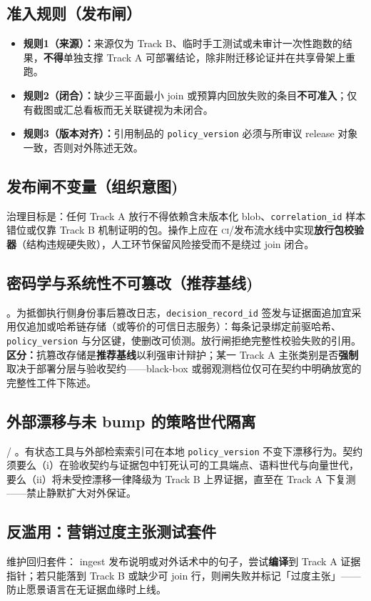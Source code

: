 \documentclass[11pt,a4paper]{report}
\begin{document}
\subsection{准入规则（发布闸）}
\begin{itemize}
  \item \textbf{规则1（来源）：}来源仅为 Track B、临时手工测试或未审计一次性跑数的结果，\textbf{不得}单独支撑 Track A 可部署结论，除非附迁移论证并在共享骨架上重跑。
  \item \textbf{规则2（闭合）：}缺少三平面最小 join 或预算内回放失败的条目\textbf{不可准入}；仅有截图或汇总看板而无关联键视为未闭合。
  \item \textbf{规则3（版本对齐）：}引用制品的 \texttt{policy\_version} 必须与所审议 release 对象一致，否则对外陈述无效。
\end{itemize}

\subsection{发布闸不变量（组织意图)}
治理目标是：任何 Track A 放行不得依赖含未版本化 blob、\texttt{correlation\_id} 样本错位或仅靠 Track B 机制证明的包。操作上应在 \textsc{ci}/发布流水线中实现\textbf{放行包校验器}（结构违规硬失败），人工环节保留风险接受而不是绕过 join 闭合。

\subsection{密码学与系统性不可篡改（推荐基线)}
\EvalFramework{}。为抵御执行侧身份事后篡改日志，\texttt{decision\_record\_id} 签发与证据面追加宜采用仅追加或哈希链存储（或等价的可信日志服务）：每条记录绑定前驱哈希、\texttt{policy\_version} 与分区键，使删改可侦测。放行闸拒绝完整性校验失败的引用。\textbf{区分：}抗篡改存储是\textbf{推荐基线}以利强审计辩护；某一 Track A 主张类别是否\textbf{强制}取决于部署分层与验收契约——black-box 或弱观测档位仅可在契约中明确放宽的完整性工件下陈述。

\subsection{外部漂移与未 bump 的策略世代隔离}
\EvalFramework{} / \ControlPlane{}。有状态工具与外部检索索引可在本地 \texttt{policy\_version} 不变下漂移行为。契约须要么（i）在验收契约与证据包中钉死认可的工具端点、语料世代与向量世代，要么（ii）将未受控漂移一律降级为 Track B 上界证据，直至在 Track A 下复测——禁止静默扩大对外保证。

\subsection{反滥用：营销过度主张测试套件}
维护回归套件： ingest 发布说明或对外话术中的句子，尝试\textbf{编译}到 Track A 证据指针；若只能落到 Track B 或缺少可 join 行，则闸失败并标记「过度主张」——防止愿景语言在无证据血缘时上线。
\end{document}
